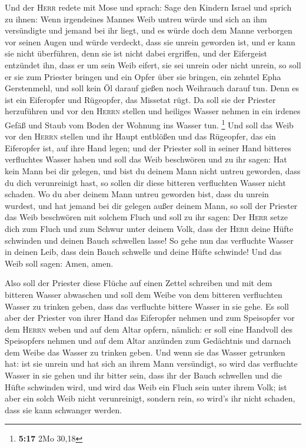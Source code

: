  Und der \textsc{Herr} redete mit Mose und sprach:
 Sage den Kindern Israel und sprich zu ihnen: Wenn
irgendeines Mannes Weib untreu würde und sich an ihm versündigte
 und jemand bei ihr liegt, und es würde doch dem Manne
verborgen vor seinen Augen und würde verdeckt, dass sie unrein geworden
ist, und er kann sie nicht überführen, denn sie ist nicht dabei
ergriffen,  und der Eifergeist entzündet ihn, dass er um
sein Weib eifert, sie sei unrein oder nicht unrein,  so
soll er sie zum Priester bringen und ein Opfer über sie bringen, ein
zehntel Epha Gerstenmehl, und soll kein Öl darauf gießen noch Weihrauch
darauf tun. Denn es ist ein Eiferopfer und Rügeopfer, das Missetat rügt.
 Da soll sie der Priester herzuführen und vor den
\textsc{Herrn} stellen  und heiliges Wasser nehmen in ein
irdenes Gefäß und Staub vom Boden der Wohnung ins Wasser tun.
\footnote{\textbf{5:17} 2Mo 30,18}  Und soll das Weib vor
den \textsc{Herrn} stellen und ihr Haupt entblößen und das Rügeopfer,
das ein Eiferopfer ist, auf ihre Hand legen; und der Priester soll in
seiner Hand bitteres verfluchtes Wasser haben  und soll
das Weib beschwören und zu ihr sagen: Hat kein Mann bei dir gelegen, und
bist du deinem Mann nicht untreu geworden, dass du dich verunreinigt
hast, so sollen dir diese bitteren verfluchten Wasser nicht schaden.
 Wo du aber deinem Mann untreu geworden bist, dass du
unrein wurdest, und hat jemand bei dir gelegen außer deinem Mann,
 so soll der Priester das Weib beschwören mit solchem
Fluch und soll zu ihr sagen: Der \textsc{Herr} setze dich zum Fluch und
zum Schwur unter deinem Volk, dass der \textsc{Herr} deine Hüfte
schwinden und deinen Bauch schwellen lasse!  So gehe nun
das verfluchte Wasser in deinen Leib, dass dein Bauch schwelle und deine
Hüfte schwinde! Und das Weib soll sagen: Amen, amen.

 Also soll der Priester diese Flüche auf einen Zettel
schreiben und mit dem bitteren Wasser abwaschen  und soll
dem Weibe von dem bitteren verfluchten Wasser zu trinken geben, dass das
verfluchte bittere Wasser in sie gehe.  Es soll aber der
Priester von ihrer Hand das Eiferopfer nehmen und zum Speisopfer vor dem
\textsc{Herrn} weben und auf dem Altar opfern, nämlich: 
er soll eine Handvoll des Speisopfers nehmen und auf dem Altar anzünden
zum Gedächtnis und darnach dem Weibe das Wasser zu trinken geben.
 Und wenn sie das Wasser getrunken hat: ist sie unrein
und hat sich an ihrem Mann versündigt, so wird das verfluchte Wasser in
sie gehen und ihr bitter sein, dass ihr der Bauch schwellen und die
Hüfte schwinden wird, und wird das Weib ein Fluch sein unter ihrem Volk;
 ist aber ein solch Weib nicht verunreinigt, sondern
rein, so wird's ihr nicht schaden, dass sie kann schwanger werden.

